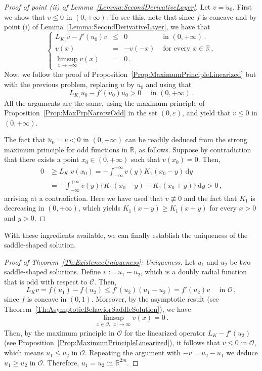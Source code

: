 \documentclass[12pt,reqno]{amsart}
\theoremstyle{definition}
\theoremstyle{remark}
\newcommand{\con}[1]{\mathbb{#1}}
\newcommand{\R}{\con{R}} %
\newcommand{\ccal}{\mathscr{C}}
\newcommand{\ocal}{\mathcal{O}}
\renewcommand{\d}{\,\mathrm{d}} %
\newcommand\beqc[1]{\left\{\begin{array}{#1}}
\newcommand\eeqc{\end{array} \right.}
\def\PDEsystem{rcll}
\def\ds{\displaystyle}
\numberwithin{equation}{section}
\begin{document}
\begin{proof}[Proof of point (ii) of Lemma~\ref{Lemma:SecondDerivativeLayer}]
	
	Let $v = \ddot{u}_0$. First we show that $v\leq 0$ in $(0,+\infty)$. To see this, note that since $f$ is concave and by point (i) of Lemma~\ref{Lemma:SecondDerivativeLayer}, we have that
	$$
	\beqc{\PDEsystem}
	L_{K_1} v - f'(u_0)v &\leq &0 & \text{ in } (0,+\infty)\,.\\
	v(x) &= &-v(-x) & \text{ for every } x\in \R\,,\\
	\ds \limsup_{x\to +\infty} v(x) &= & 0\,.
	\eeqc
	$$
	Now, we follow the proof of Proposition~\ref{Prop:MaximumPrincipleLinearized} but with the previous problem, replacing $u$ by $u_0$ and using that
	$$
	L_{K_1} u_0 - f'(u_0)u_0 > 0 \quad \text{ in } (0,+\infty)\,. 
	$$
	All the arguments are the same, using the maximum principle of Proposition~\ref{Prop:MaxPrpNarrowOdd} in the set $(0,\varepsilon)$, and yield that $v\leq 0$ in $(0,+\infty)$.
	
	The fact that $\ddot{u}_0 = v < 0$ in $(0,+\infty)$ can be readily deduced from the strong maximum principle for odd functions in $\R$, as follows. Suppose by contradiction that there exists a point $x_0\in (0,+\infty)$ such that $v(x_0) = 0$. Then,
	\begin{align*}
	0 &\geq L_{K_1} v (x_0) = - \int_{-\infty}^{+\infty}	v(y) K_1(x_0 - y) \d y \\
	&= - \int_{-\infty}^{+\infty} v(y) \{ K_1(x_0 - y) - K_1(x_0 + y)\} \d y > 0\,,
	\end{align*}
	arriving at a contradiction. Here we have used that $v\not \equiv 0$ and the fact that $K_1$ is decreasing in $(0,+\infty)$, which yields $K_1(x - y) \geq  K_1(x + y)$ for every $x>0$ and $y>0$.
\end{proof}






With these ingredients available, we can finally establish the uniqueness of the saddle-shaped solution.



\begin{proof}[Proof of Theorem~\ref{Th:ExistenceUniqueness}: Uniqueness]
	Let $u_1$ and $u_2$ be two saddle-shaped solutions. Define $v := u_1 - u_2$, which is a doubly radial function that is odd with respect to $\ccal$. Then,
	$$
	L_K v = f(u_1) - f(u_2) \leq f'(u_2) (u_1 - u_2) = f'(u_2) v \quad \textrm{ in } \ocal\,,
	$$
	since $f$ is concave in $(0,1)$. Moreover, by the asymptotic result (see Theorem~\ref{Th:AsymptoticBehaviorSaddleSolution}), we have
	$$
	\limsup_{x\in \ocal, \ |x|\to \infty} v(x) = 0\,.
	$$
	Then, by the maximum principle in $\ocal$ for the linearized operator $L_K  - f'(u_2)$ (see Proposition~\ref{Prop:MaximumPrincipleLinearized}), it follows that $v \leq 0$ in $\ocal$, which means $u_1 \leq u_2$ in $\ocal$. Repeating the  argument with $-v = u_2 - u_1$ we deduce $u_1 \geq u_2$ in $\ocal$. Therefore, $u_1 = u_2$ in $\R^{2m}$.
\end{proof}
\end{document}
